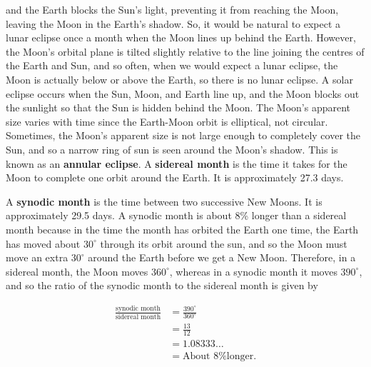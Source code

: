 \documentclass{templates/homework}
\begin{document}
and the Earth blocks the Sun's light, preventing it from reaching the
Moon, leaving the Moon in the Earth's shadow. So, it would be natural to
expect a lunar eclipse once a month when the Moon lines up behind the Earth.
However, the Moon's orbital plane is tilted slightly relative to the line joining
the centres of the Earth and Sun, and so often, when we would expect a lunar eclipse,
the Moon is actually below or above the Earth, so there is no lunar eclipse.
\exercisepart
A solar eclipse occurs when the Sun, Moon, and Earth line up, and the Moon
blocks out the sunlight so that the Sun is hidden behind the Moon. The Moon's apparent size
varies with time since the Earth-Moon orbit is elliptical, not circular. Sometimes,
the Moon's apparent size is not large enough to completely cover the Sun, and so a
narrow ring of sun is seen around the Moon's shadow. This is known as an
\textbf{annular eclipse}.
\exercisepart
A \textbf{sidereal month} is the time it takes for the Moon to complete
one orbit around the Earth. It is approximately 27.3 days.

A \textbf{synodic month} is the time between two successive New Moons. It is
approximately 29.5 days. A synodic month is about 8\% longer than a sidereal month
because in the time the month has orbited the Earth one time, the Earth has moved about $30^\circ$ through its
orbit around the sun, and so the Moon must move an extra $30^\circ$ around the Earth before
we get a New Moon. Therefore, in a sidereal month, the Moon moves $360^\circ$, whereas in a synodic month
it moves $390^\circ$, and so the ratio of the synodic month to the sidereal month is given by

\begin{align*}
    \frac{\text{synodic month}}{\text{sidereal month}}
    &= \frac{390^\circ}{360^\circ} \\
    &= \frac{13}{12} \\
    &= 1.08333\dots \\
    &= \text{About 8\% longer}.
\end{align*}
\exercise
\end{document}
